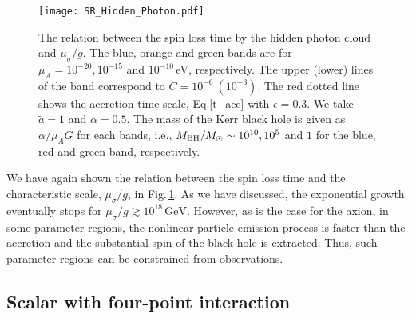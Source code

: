 \documentclass[%
 preprint,
 nofootinbib,
 amsmath,amssymb,
 aps,
 a4paper
]{revtex4-1}
\begin{document}
\begin{figure}[t]
\begin{center}
\texttt{[image: SR\_Hidden\_Photon.pdf]}
\end{center}
\caption{
 The relation between the spin loss time by the hidden photon cloud and $\mu_\sigma / g$. The blue, orange and green bands are for $\mu_A = 10^{-20}, 10^{-15}$ and $10^{-10}$\,eV, respectively. The upper (lower) lines of the band correspond to $C=10^{-6}\ (10^{-3})$. The red dotted line shows the accretion time scale, Eq.\eqref{t_acc} with $\epsilon = 0.3$. We take $\tilde a = 1$ and $\alpha = 0.5$. The mass of the Kerr black hole is given as $\alpha / \mu_A G$ for each bands, i.e., $M_{\rm BH} / M_{\odot} \sim 10^{10}, 10^5$ and $1$ for the blue, red and green band, respectively. 
}
\label{fig:HP_spin_loss}
\end{figure}

We have again shown the relation between the spin loss time and the characteristic scale, $\mu_\sigma / g$, in Fig.\,\ref{fig:HP_spin_loss}. As we have discussed, the exponential growth eventually stops for $\mu_\sigma / g \gtrsim 10^{18}\,\text{GeV}$. However, as is the case for the axion, in some parameter regions, the nonlinear particle emission process is faster than the accretion and the substantial spin of the black hole is extracted. Thus, such parameter regions can be constrained from observations.





\subsection{Scalar with four-point interaction}
\label{sec:pp_scalar}
\end{document}
